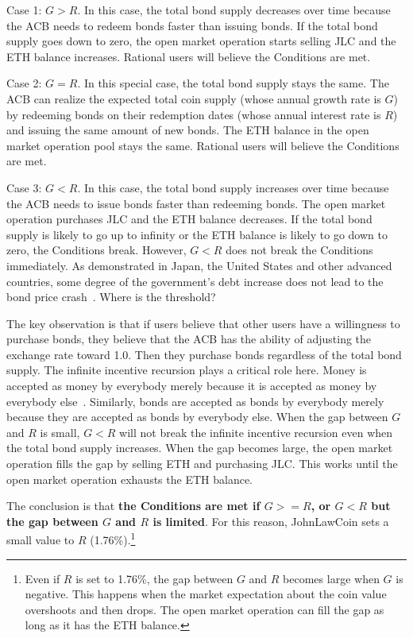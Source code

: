 \documentclass[dvipdfmx,a4paper]{article}
\begin{document}
Case 1: $G>R$. In this case, the total bond supply decreases over time because the ACB needs to redeem bonds faster than issuing bonds. If the total bond supply goes down to zero, the open market operation starts selling JLC and the ETH balance increases. Rational users will believe the Conditions are met.

Case 2: $G=R$. In this special case, the total bond supply stays the same. The ACB can realize the expected total coin supply (whose annual growth rate is $G$) by redeeming bonds on their redemption dates (whose annual interest rate is $R$) and issuing the same amount of new bonds. The ETH balance in the open market operation pool stays the same. Rational users will believe the Conditions are met.

Case 3: $G<R$. In this case, the total bond supply increases over time because the ACB needs to issue bonds faster than redeeming bonds. The open market operation purchases JLC and the ETH balance decreases. If the total bond supply is likely to go up to infinity or the ETH balance is likely to go down to zero, the Conditions break. However, $G<R$ does not break the Conditions immediately. As demonstrated in Japan, the United States and other advanced countries, some degree of the government's debt increase does not lead to the bond price crash~\cite{elmendorf1999government}. Where is the threshold?

The key observation is that if users believe that other users have a willingness to purchase bonds, they believe that the ACB has the ability of adjusting the exchange rate toward 1.0. Then they purchase bonds regardless of the total bond supply. The infinite incentive recursion plays a critical role here. Money is accepted as money by everybody merely because it is accepted as money by everybody else~\cite{iwai1996boostrap,iwai1997evolution}. Similarly, bonds are accepted as bonds by everybody merely because they are accepted as bonds by everybody else. When the gap between $G$ and $R$ is small, $G<R$ will not break the infinite incentive recursion even when the total bond supply increases. When the gap becomes large, the open market operation fills the gap by selling ETH and purchasing JLC. This works until the open market operation exhausts the ETH balance.

The conclusion is that \textbf{the Conditions are met if $G>=R$, or $G<R$ but the gap between $G$ and $R$ is limited}. For this reason, JohnLawCoin sets a small value to $R$ (1.76\%).\footnote{Even if $R$ is set to 1.76\%, the gap between $G$ and $R$ becomes large when $G$ is negative. This happens when the market expectation about the coin value overshoots and then drops. The open market operation can fill the gap as long as it has the ETH balance.}
\end{document}
